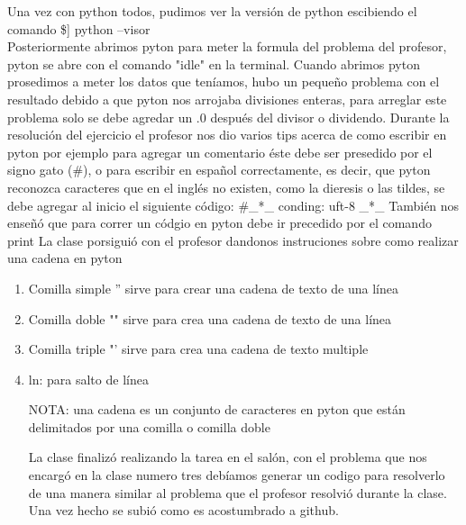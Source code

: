 \documentclass[letterpaper, 12pt, oneside]{article}%
\begin{document}
Una vez con python todos, pudimos ver la versión de python escibiendo el comando \$] python --visor\\
Posteriormente abrimos pyton para meter la formula del problema del profesor, pyton se abre con el comando "idle" en la terminal. Cuando abrimos pyton prosedimos a meter los datos que teníamos, hubo un pequeño problema con el resultado debido a que pyton nos arrojaba divisiones enteras, para arreglar este problema solo se debe agredar un .0 después del divisor o dividendo. 
Durante la resolución del ejercicio el profesor nos dio varios tips acerca de como escribir en pyton por ejemplo para agregar un comentario éste debe ser presedido por el signo gato (\#), o para escribir en español correctamente, es decir, que pyton reconozca caracteres que en el inglés no existen, como la dieresis o las tildes, se debe agregar al inicio el siguiente código: \#\_*\_ conding: uft-8 \_*\_
También nos enseñó que para correr un códgio en pyton debe ir precedido por el comando print
La clase porsiguió con el profesor dandonos instruciones sobre como realizar una cadena en pyton  
\begin{enumerate}
	\item Comilla simple '' sirve para crear una cadena de texto de una línea
	\item Comilla doble "" sirve para crea una cadena de texto de una línea
	\item Comilla triple "' sirve para crea una cadena de texto multiple
	\item ln: para salto de línea
	
NOTA: una cadena es un conjunto de caracteres en pyton que están delimitados por una comilla o comilla doble
	
La clase finalizó realizando la tarea en el salón, con el problema que nos encargó en la clase numero tres debíamos generar un codigo para resolverlo de una manera similar al problema que el profesor resolvió durante la clase. Una vez hecho se subió como es acostumbrado a github.
\end{enumerate}
\end{document}
